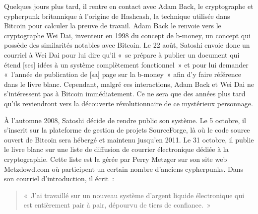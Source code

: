 Quelques jours plus tard, il rentre en contact avec Adam Back, le cryptographe et cypherpunk britannique à l'origine de Hashcash, la technique utilisée dans Bitcoin pour calculer la preuve de travail. Adam Back le renvoie vers le cryptographe Wei Dai, inventeur en 1998 du concept de b-money, un concept qui possède des similarités notables avec Bitcoin. Le 22 août, Satoshi envoie donc un courriel à Wei Dai pour lui dire qu'il «~se prépare à publier un document qui étend [ses] idées à un système complètement fonctionnel~» et pour lui demander «~l'année de publication de [sa] page sur la b-money~» afin d'y faire référence dans le livre blanc. Cependant, malgré ces interactions, Adam Back et Wei Dai ne s'intéressent pas à Bitcoin immédiatement. Ce ne sera que des années plus tard qu'ils reviendront vers la découverte révolutionnaire de ce mystérieux personnage.


À l'automne 2008, Satoshi décide de rendre public son système. Le 5 octobre, il s'inscrit sur la plateforme de gestion de projets SourceForge, là où le code source ouvert de Bitcoin sera hébergé et maintenu jusqu'en 2011. Le 31 octobre, il publie le livre blanc sur une liste de diffusion de courrier électronique dédiée à la cryptographie. Cette liste est la  gérée par Perry Metzger sur son site web Metzdowd.com où participent un certain nombre d'anciens cypherpunks. Dans son courriel d'introduction, il écrit~:

\begin{quote}
«~J'ai travaillé sur un nouveau système d'argent liquide électronique qui est entièrement pair à pair, dépourvu de tiers de confiance.~»
\end{quote}

